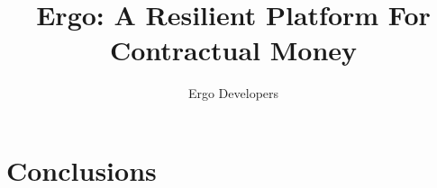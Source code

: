 \documentclass[]{article}
\begin{document}
    \title{Ergo: A Resilient Platform For Contractual Money}
    \author{Ergo Developers}


    \maketitle

    

    

    

    

    

    

    

    \section{Conclusions}
    \label{sec:conclusions}

    
\end{document}
